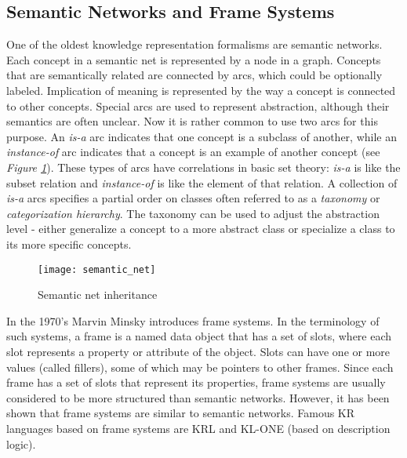 \subsection{Semantic Networks and Frame Systems}
One of the oldest knowledge representation formalisms are semantic networks. Each concept in a semantic net is represented by a node in a graph. Concepts that are
semantically related are connected by arcs, which could be optionally labeled. Implication of meaning is represented by the way a concept is connected to other concepts. Special arcs are used to represent abstraction, although their semantics are often unclear. Now it is rather common to use two arcs for this purpose. An \textit{is-a} arc indicates that one concept is a subclass of another, while an \textit{instance-of} arc indicates that a concept is an example of another concept (see \textit{Figure \ref{fig:semantic_net}}). These types of arcs have correlations in basic set theory: \textit{is-a} is like the subset relation and \textit{instance-of} is like the element of that relation.
A collection of \textit{is-a} arcs specifies a partial order on classes often referred to as a \textit{taxonomy} or \textit{categorization hierarchy}. The taxonomy can be used to adjust the abstraction level - either generalize a concept to a more abstract class or specialize a class to its more specific concepts.

\begin{figure}[h!]
    \centering
    \texttt{[image: semantic\_net]}
    \caption{Semantic net inheritance}
    \label{fig:semantic_net}
\end{figure}

In the 1970's Marvin Minsky introduces frame systems. In the terminology of such systems, a frame is a named data object that has a set of slots, where each slot
represents a property or attribute of the object. Slots can have one or more values (called fillers), some of which may be pointers to other frames. Since each frame has a set of slots that represent its properties, frame systems are usually considered to be
more structured than semantic networks. However, it has been shown that frame systems are similar to semantic networks. Famous KR languages based on frame systems are KRL and KL-ONE (based on description logic). 

